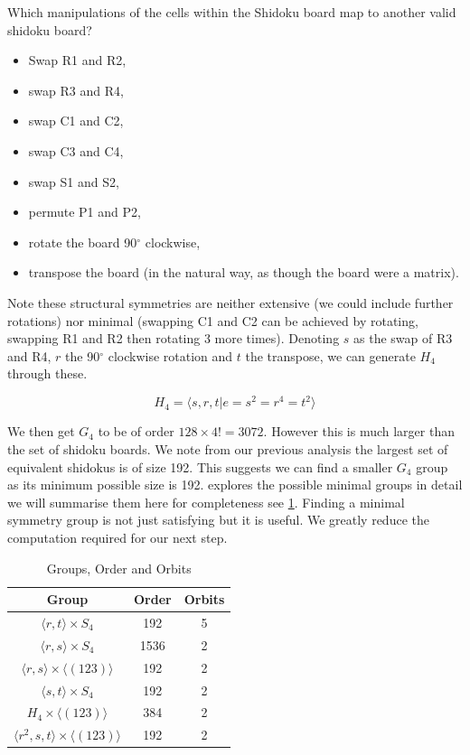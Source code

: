 \documentclass[a4paper,11pt]{report}
\begin{document}
Which manipulations of the cells within the Shidoku board map to another valid shidoku board? 
\begin{itemize}
\item Swap R1 and R2,
\item swap R3 and R4,
\item swap C1 and C2,
\item swap C3 and C4,
\item swap S1 and S2,
\item permute P1 and P2,
\item rotate the board 90$^\circ$ clockwise,
\item transpose the board (in the natural way, as though the board were a matrix).
\end{itemize}
Note these structural symmetries are neither extensive (we could include further rotations) nor minimal (swapping C1 and C2 can be achieved by rotating, swapping R1 and R2 then rotating 3 more times). Denoting $s$ as the swap of R3 and R4, $r$ the 90$^\circ$ clockwise rotation and $t$ the transpose, we can generate $H_4$ through these.

\begin{equation}H_4 = \langle s,r,t | e=s^2=r^4=t^2\rangle\end{equation}

We then get $G_4$ to be of order $128\times 4!=3072$. However this is much larger than the set of shidoku boards. We note from our previous analysis the largest set of equivalent shidokus is of size 192. This suggests we can find a smaller $G_4$ group as its minimum possible size is 192. \cite{} explores the possible minimal groups in detail we will summarise them here for completeness see \ref{table:group}. Finding a minimal symmetry group is not just satisfying but it is useful. We greatly reduce the computation required for our next step.

\begin{table}[!h]
\begin{center}
\begin{tabular}{ |c|c|c| }
 \hline
Group & Order & Orbits\\
 \hline
 $\langle r,t \rangle \times S_4$ & 192 & 5\\
 $\langle r,s \rangle \times S_4$ & 1536 & 2\\
 $\langle r,s \rangle \times \langle (123)\rangle$ & 192 & 2\\
 $\langle s,t \rangle \times S_4$ & 192 & 2\\
 $H_4 \times\langle (123) \rangle $ & 384 & 2\\
 $\langle r^2,s,t \rangle \times \langle (123) \rangle$ & 192 & 2\\
 \hline
\end{tabular}
\end{center}
\caption{\label{table:group}Groups, Order and Orbits}
\end{table}
\end{document}
